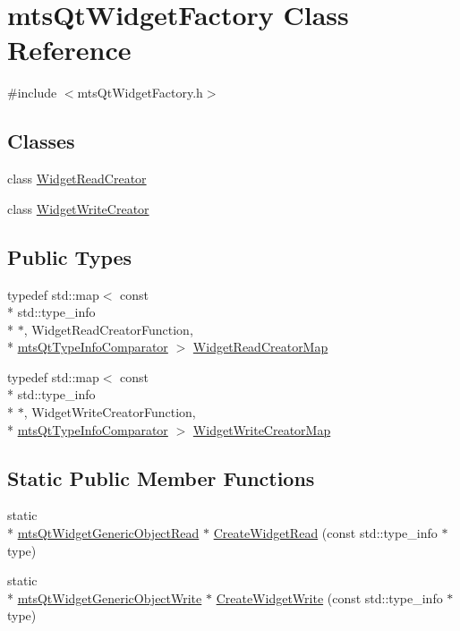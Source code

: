 \hypertarget{classmts_qt_widget_factory}{\section{mts\-Qt\-Widget\-Factory Class Reference}
\label{classmts_qt_widget_factory}
}


{\ttfamily \#include $<$mts\-Qt\-Widget\-Factory.\-h$>$}

\subsection*{Classes}
\begin{DoxyCompactItemize}
\item 
class \hyperlink{classmts_qt_widget_factory_1_1_widget_read_creator}{Widget\-Read\-Creator}
\item 
class \hyperlink{classmts_qt_widget_factory_1_1_widget_write_creator}{Widget\-Write\-Creator}
\end{DoxyCompactItemize}
\subsection*{Public Types}
\begin{DoxyCompactItemize}
\item 
typedef std\-::map$<$ const \\*
std\-::type\-\_\-info \\*
$\ast$, Widget\-Read\-Creator\-Function, \\*
\hyperlink{classmts_qt_type_info_comparator}{mts\-Qt\-Type\-Info\-Comparator} $>$ \hyperlink{classmts_qt_widget_factory_a22c882dba48529d554a71443765cb645}{Widget\-Read\-Creator\-Map}
\item 
typedef std\-::map$<$ const \\*
std\-::type\-\_\-info \\*
$\ast$, Widget\-Write\-Creator\-Function, \\*
\hyperlink{classmts_qt_type_info_comparator}{mts\-Qt\-Type\-Info\-Comparator} $>$ \hyperlink{classmts_qt_widget_factory_aa2d044bd78383f0beb1973cbb076d4df}{Widget\-Write\-Creator\-Map}
\end{DoxyCompactItemize}
\subsection*{Static Public Member Functions}
\begin{DoxyCompactItemize}
\item 
static \\*
\hyperlink{classmts_qt_widget_generic_object_read}{mts\-Qt\-Widget\-Generic\-Object\-Read} $\ast$ \hyperlink{classmts_qt_widget_factory_a7cc69b831fc2b45023c291479a5d1f09}{Create\-Widget\-Read} (const std\-::type\-\_\-info $\ast$type)
\item 
static \\*
\hyperlink{classmts_qt_widget_generic_object_write}{mts\-Qt\-Widget\-Generic\-Object\-Write} $\ast$ \hyperlink{classmts_qt_widget_factory_acd6e5c0627a787519689a1a455cd804d}{Create\-Widget\-Write} (const std\-::type\-\_\-info $\ast$type)
\end{DoxyCompactItemize}
